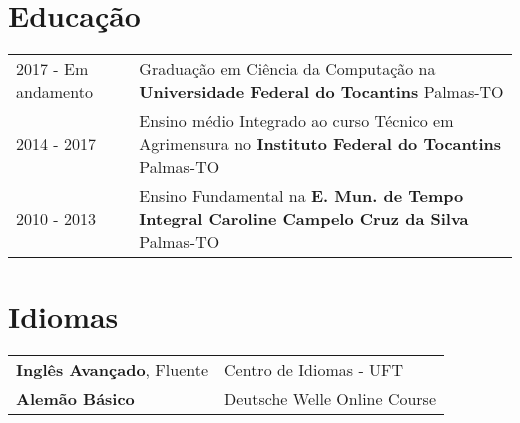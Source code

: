 \documentclass[a4paper,12pt]{article}
\begin{document}
\section{Educação}
\begin{tabularx}{\linewidth}{@{}l X@{}}	
2017 - Em andamento & Graduação em Ciência da Computação na \textbf{Universidade Federal do Tocantins} \hfill Palmas-TO \\

2014 - 2017 & Ensino médio Integrado ao curso Técnico em Agrimensura no \textbf{Instituto Federal do Tocantins} \hfill Palmas-TO \\ 

2010 - 2013 & Ensino Fundamental na \textbf{E. Mun. de Tempo Integral Caroline Campelo Cruz da Silva} \hfill Palmas-TO \\ 
\end{tabularx}


\section{Idiomas}
\begin{tabularx}{\linewidth}{@{}l X@{}}
\textbf{Inglês Avançado}, Fluente & \hfill Centro de Idiomas - UFT \\
\textbf{Alemão Básico} & \hfill  Deutsche Welle Online Course \\  
\end{tabularx}


\end{document}
